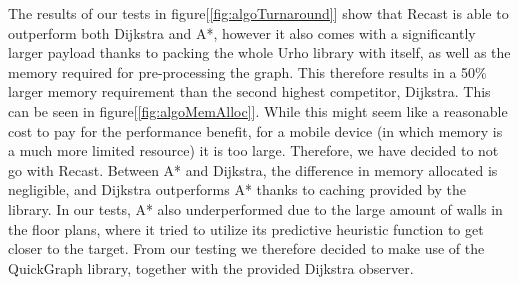 \documentclass[main.tex]{subfiles}
\begin{document}
The results of our tests in figure[\ref{fig:algoTurnaround}] show that Recast is able to outperform both Dijkstra and A*, however it also comes with a significantly larger payload thanks to packing the whole Urho library with itself, as well as the memory required for pre-processing the graph. This therefore results in a 50\% larger memory requirement than the second highest competitor, Dijkstra. This can be seen in figure[\ref{fig:algoMemAlloc}]. While this might seem like a reasonable cost to pay for the performance benefit, for a mobile device (in which memory is a much more limited resource) it is too large. Therefore, we have decided to not go with Recast. Between A* and Dijkstra, the difference in memory allocated is negligible, and Dijkstra outperforms A* thanks to caching provided by the library. In our tests, A* also underperformed due to the large amount of walls in the floor plans, where it tried to utilize its predictive heuristic function to get closer to the target. From our testing we therefore decided to make use of the QuickGraph library, together with the provided Dijkstra observer. 

\nocite{*}



\end{document}
